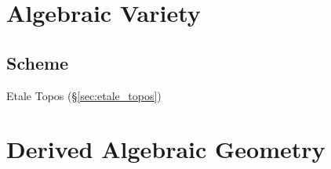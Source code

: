 \section{Algebraic Variety}\label{sec:algebraic_variety}

\subsection{Scheme}\label{sec:scheme}

Etale Topos (\S\ref{sec:etale_topos})



\section{Derived Algebraic Geometry}
\label{sec:derived_algebraic_geometry}
